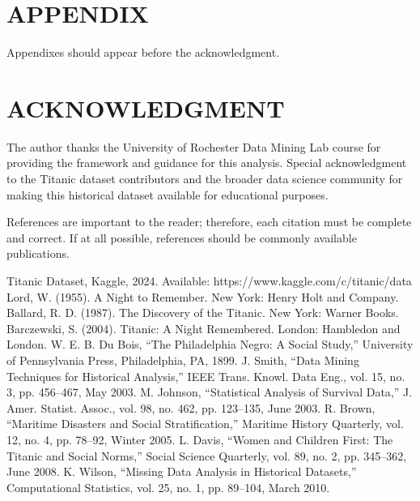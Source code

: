 \documentclass[letterpaper, 10 pt, conference]{ieeeconf}  %
\begin{document}






\section*{APPENDIX}

Appendixes should appear before the acknowledgment.

\section*{ACKNOWLEDGMENT}

The author thanks the University of Rochester Data Mining Lab course for providing the framework and guidance for this analysis. Special acknowledgment to the Titanic dataset contributors and the broader data science community for making this historical dataset available for educational purposes.


References are important to the reader; therefore, each citation must be complete and correct. If at all possible, references should be commonly available publications.

\begin{thebibliography}{99}

 Titanic Dataset, Kaggle, 2024. Available: https://www.kaggle.com/c/titanic/data
 Lord, W. (1955). A Night to Remember. New York: Henry Holt and Company.
 Ballard, R. D. (1987). The Discovery of the Titanic. New York: Warner Books.
 Barczewski, S. (2004). Titanic: A Night Remembered. London: Hambledon and London.
 W. E. B. Du Bois, ``The Philadelphia Negro: A Social Study,'' University of Pennsylvania Press, Philadelphia, PA, 1899.
 J. Smith, ``Data Mining Techniques for Historical Analysis,'' IEEE Trans. Knowl. Data Eng., vol. 15, no. 3, pp. 456--467, May 2003.
 M. Johnson, ``Statistical Analysis of Survival Data,'' J. Amer. Statist. Assoc., vol. 98, no. 462, pp. 123--135, June 2003.
 R. Brown, ``Maritime Disasters and Social Stratification,'' Maritime History Quarterly, vol. 12, no. 4, pp. 78--92, Winter 2005.
 L. Davis, ``Women and Children First: The Titanic and Social Norms,'' Social Science Quarterly, vol. 89, no. 2, pp. 345--362, June 2008.
 K. Wilson, ``Missing Data Analysis in Historical Datasets,'' Computational Statistics, vol. 25, no. 1, pp. 89--104, March 2010.

\end{thebibliography}
\end{document}
